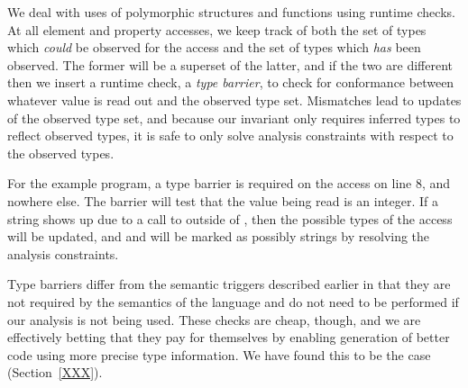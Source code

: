 We deal with uses of polymorphic structures and functions using runtime checks.
At all element and property accesses, we keep track of both the set of
types which \emph{could} be observed for the access and the set of types
which \emph{has} been observed.
The former will be a superset of the latter, and if the two are different then
we insert a runtime check, a {\it type barrier}, to check for conformance
between whatever value is read out and the observed type set.
Mismatches lead to updates of the observed type set, and because our
invariant only requires inferred types to reflect observed types, it is
safe to only solve analysis constraints with respect to the observed types.

For the example program, a type barrier is required on the  access
on line 8, and nowhere else. The barrier will test that the value being read
is an integer. If a string shows up due to a call to 
outside of , then the possible types of the  access
will be updated, and  and  will be marked as possibly
strings by resolving the analysis constraints.

Type barriers differ from the semantic triggers described earlier in that
they are not required by the semantics of the language and do not need to
be performed if our analysis is not being used.
These checks are cheap, though, and we are effectively betting that they
pay for themselves by enabling generation of better code using more precise type information.
We have found this to be the case (Section~\ref{XXX}).


